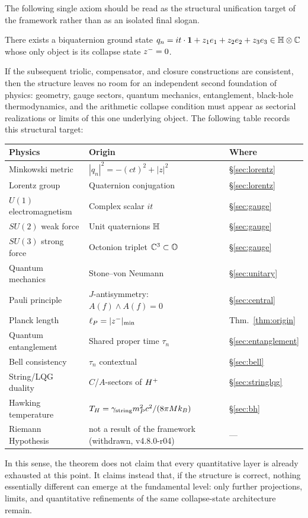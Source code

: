 \begin{theorem}\label{thm:toe}
The following single axiom should be read as the structural unification
 target of the framework rather than as an isolated final slogan.
\begin{axiom}
There exists a biquaternion ground state
$q_n = it\cdot\mathbf{1}+z_1 e_1+z_2 e_2+z_3 e_3\in\mathbb{H}\otimes\mathbb{C}$
whose only object is its collapse state $z^-=0$.
\end{axiom}
If the subsequent triolic, compensator, and closure constructions are
consistent, then the structure leaves no room for an independent second
foundation of physics: geometry, gauge sectors, quantum mechanics,
entanglement, black-hole thermodynamics, and the arithmetic collapse
condition must appear as sectorial realizations or limits of this one
underlying object. The following table records this structural target:
\begin{center}
\renewcommand{\arraystretch}{1.2}
\begin{tabular}{lll}
\toprule
Physics & Origin & Where\\
\midrule
Minkowski metric & $|q_n|^2=-(ct)^2+|z|^2$ & \S\ref{sec:lorentz}\\
Lorentz group & Quaternion conjugation & \S\ref{sec:lorentz}\\
$U(1)$ electromagnetism & Complex scalar $it$ & \S\ref{sec:gauge}\\
$SU(2)$ weak force & Unit quaternions $\mathbb{H}$ & \S\ref{sec:gauge}\\
$SU(3)$ strong force & Octonion triplet $\mathbb{C}^3\subset\mathbb{O}$ & \S\ref{sec:gauge}\\
Quantum mechanics & Stone--von Neumann & \S\ref{sec:unitary}\\
Pauli principle & $J$-antisymmetry: $A(f)\wedge A(f)=0$ & \S\ref{sec:central}\\
Planck length & $\ell_P=|z^-|_{\min}$ & Thm.~\ref{thm:origin}\\
Quantum entanglement & Shared proper time $\tau_n$ & \S\ref{sec:entanglement}\\
Bell consistency & $\tau_n$ contextual & \S\ref{sec:bell}\\
String/LQG duality & $C$/$A$-sectors of $H^+$ & \S\ref{sec:stringlqg}\\
Hawking temperature & $T_H=\gamma_{\mathrm{string}} m_P^2 c^2/(8\pi M k_B)$ & \S\ref{sec:bh}\\
Riemann Hypothesis & not a result of the framework (withdrawn, v4.8.0-r04) & ---\\
\bottomrule
\end{tabular}
\end{center}
In this sense, the theorem does not claim that every quantitative layer is
already exhausted at this point. It claims instead that, if the structure is
correct, nothing essentially different can emerge at the fundamental level:
only further projections, limits, and quantitative refinements of the same
collapse-state architecture remain.
\end{theorem}
